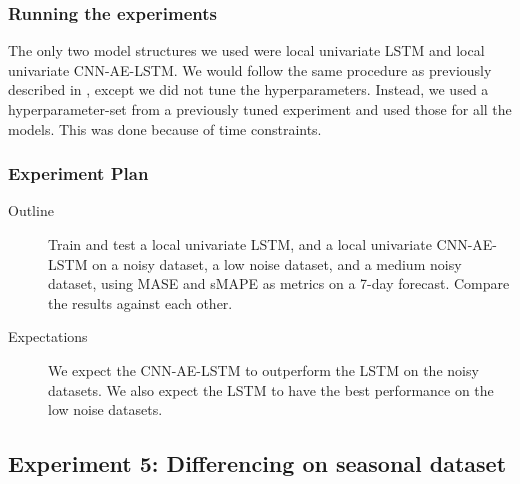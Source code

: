 \subsubsection{Running the experiments}
The only two model structures we used were local univariate LSTM
and local univariate CNN-AE-LSTM.
We would follow the same procedure as previously described in ,
except we did not tune the hyperparameters. Instead, we
used a hyperparameter-set from a previously tuned experiment and used those for all the models.
This was done because of time constraints.

\subsubsection{Experiment Plan}
\begin{description}
  \item[Outline]{
              Train and test a local univariate LSTM,
              and a local univariate CNN-AE-LSTM on a noisy dataset, a low noise dataset, and a medium noisy dataset,
              using MASE and sMAPE as metrics on a 7-day forecast.
              Compare the results against each other.
        }
\end{description}

\begin{description}
  \item[Expectations]{
              We expect the CNN-AE-LSTM to outperform the LSTM on the noisy datasets.
              We also expect the LSTM to have the best performance on the low noise datasets.
        }
\end{description}

\subsection{Experiment 5: Differencing on seasonal dataset}
